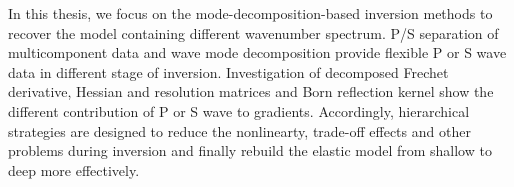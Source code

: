 \begin{eabstract}
In this thesis, we focus on the mode-decomposition-based inversion methods to recover the model
containing different wavenumber spectrum. P/S separation of multicomponent data and wave mode
decomposition provide flexible P or S wave data in different stage of inversion.
Investigation of decomposed Frechet derivative, Hessian and resolution matrices and Born reflection
kernel show the different contribution of P or S wave to gradients. Accordingly, hierarchical
strategies are designed to reduce the nonlinearty, trade-off
effects and other problems during inversion and finally rebuild the elastic model from shallow to
deep more effectively. 

\end{eabstract}

